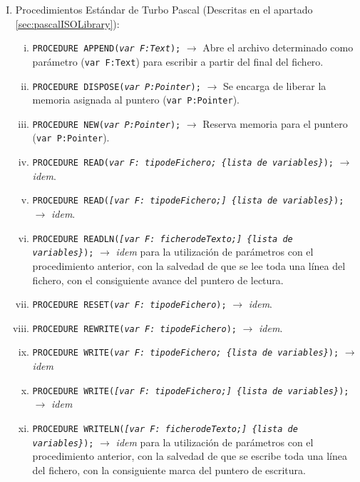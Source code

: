 \begin{enumerate}[I.]
\item {}Procedimientos Estándar de Turbo Pascal (Descritas en el apartado 
\ref{sec:pascalISOLibrary}):

\begin{enumerate}[i.]
\item \texttt{PROCEDURE APPEND(\textit{var F:Text});} $\rightarrow$ Abre el
archivo determinado como parámetro (\texttt{var F:Text}) para escribir a partir 
del final del fichero.
\item \texttt{PROCEDURE DISPOSE(\textit{var P:Pointer});} $\rightarrow$ Se 
encarga de liberar la memoria asignada al puntero (\texttt{var P:Pointer}).
\item \texttt{PROCEDURE NEW(\textit{var P:Pointer});} $\rightarrow$ Reserva 
memoria para el puntero (\texttt{var P:Pointer}).
\item \texttt{PROCEDURE READ(\textit{var F: tipodeFichero; \{lista de
variables\}});} $\rightarrow$ \textit{idem}.
\item \texttt{PROCEDURE READ(\textit{[var F: tipodeFichero;] \{lista de 
variables\}});} $\rightarrow$ \textit{idem}.
\item \texttt{PROCEDURE READLN(\textit{[var F: ficherodeTexto;] \{lista de
variables\}});} $\rightarrow$ \textit{idem} para la utilización de parámetros 
con el procedimiento anterior, con la salvedad de que se lee toda una línea del 
fichero, con el consiguiente avance del puntero de lectura.
\item \texttt{PROCEDURE RESET(\textit{var F: tipodeFichero});} $\rightarrow$ 
\textit{idem}.
\item \texttt{PROCEDURE REWRITE(\textit{var F: tipodeFichero});} $\rightarrow$ 
\textit{idem}.
\item \texttt{PROCEDURE WRITE(\textit{var F: tipodeFichero; \{lista de
variables\}});} $\rightarrow$ \textit{idem}
\item \texttt{PROCEDURE WRITE(\textit{[var F: tipodeFichero;] \{lista de
variables\}});} $\rightarrow$ \textit{idem}
\item \texttt{PROCEDURE WRITELN(\textit{[var F: ficherodeTexto;] \{lista de
variables\}});} $\rightarrow$ \textit{idem} para la utilización de parámetros 
con el procedimiento anterior, con la salvedad de que se escribe toda una línea 
del fichero, con la consiguiente marca del puntero de escritura.
\end{enumerate}

\begin{table}[h]


\end{table}
\end{enumerate}
